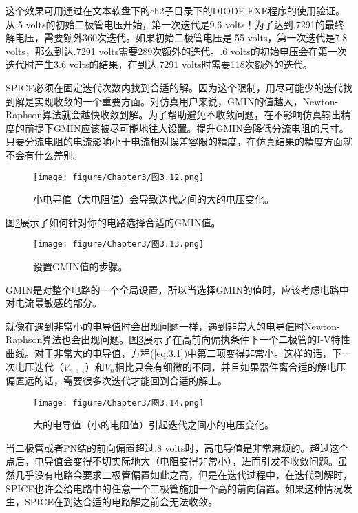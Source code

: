 这个效果可用通过在文本软盘下的ch2子目录下的DIODE.EXE程序的使用验证。从.5 volts的初始二极管电压开始，第一次迭代是9.6 volts！为了达到.7291的最终解电压，需要额外360次迭代。如果初始二极管电压是.55 volts，第一次迭代是7.8 volts，那么到达.7291 volts需要289次额外的迭代。.6 volts的初始电压会在第一次迭代时产生3.6 volts的结果，在到达.7291 volts时需要118次额外的迭代。

SPICE必须在固定迭代次数内找到合适的解。因为这个限制，用尽可能少的迭代找到解是实现收敛的一个重要方面。对仿真用户来说，GMIN的值越大，Newton-Raphson算法就会越快收敛到解。为了帮助避免不收敛问题，在不影响仿真输出精度的前提下GMIN应该被尽可能地往大设置。提升GMIN会降低分流电阻的尺寸。只要分流电阻的电流影响小于电流相对误差容限的精度，在仿真结果的精度方面就不会有什么差别。

\begin{figure}[htbp]
\small
    \centering
    \texttt{[image: figure/Chapter3/图3.12.png]}
    \caption{小电导值（大电阻值）会导致迭代之间的大的电压变化。}
    \label{图3.12}
\end{figure}

图\ref{图3.13}展示了如何针对你的电路选择合适的GMIN值。
\begin{figure}[htbp]
\small
    \centering
    \texttt{[image: figure/Chapter3/图3.13.png]}
    \caption{设置GMIN值的步骤。}
    \label{图3.13}
\end{figure}

GMIN是对整个电路的一个全局设置，所以当选择GMIN的值时，应该考虑电路中对电流最敏感的部分。

就像在遇到非常小的电导值时会出现问题一样，遇到非常大的电导值时Newton-Raphson算法也会出现问题。图\ref{图3.14}展示了在高前向偏执条件下一个二极管的I-V特性曲线。对于非常大的电导值，方程(\ref{eq:3.1})中第二项变得非常小。这样的话，下一次电压迭代（$V_{n+1}$）和$V_n$相比只会有细微的不同，并且如果器件离合适的解电压偏置远的话，需要很多次迭代才能回到合适的解上。

\begin{figure}[htbp]
\small
    \centering
    \texttt{[image: figure/Chapter3/图3.14.png]}
    \caption{大的电导值（小的电阻值）引起迭代之间小的电压变化。}
    \label{图3.14}
\end{figure}

当二极管或者PN结的前向偏置超过.8 volts时，高电导值是非常麻烦的。超过这个点后，电导值会变得不切实际地大（电阻变得非常小），进而引发不收敛问题。虽然几乎没有电路会要求二极管偏置如此之高，但是在迭代过程中，在迭代到解时，SPICE也许会给电路中的任意一个二极管施加一个高的前向偏置。如果这种情况发生，SPICE在到达合适的电路解之前会无法收敛。

